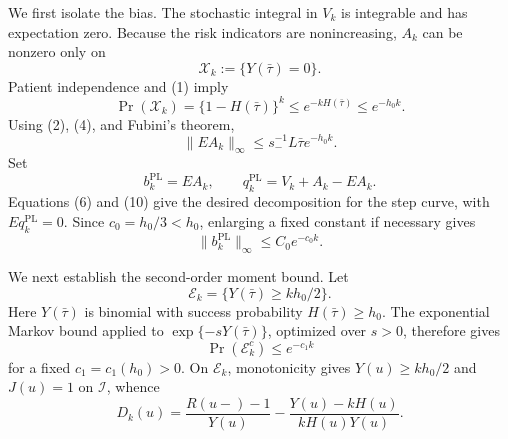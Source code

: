 We first isolate the bias.  The stochastic integral in \(V_k\) is integrable and has expectation zero.  Because the risk indicators are nonincreasing, \(A_k\) can be nonzero only on
\[
 \mathcal X_k:=\{Y(\bar\tau)=0\}.
\]
Patient independence and (1) imply
\[
 \Pr(\mathcal X_k)=\{1-H(\bar\tau)\}^k
 \le e^{-kH(\bar\tau)}\le e^{-h_0k}.                         \tag{8}
\]
Using (2), (4), and Fubini's theorem,
\[
 \|EA_k\|_\infty
 \le s_-^{-1}L\bar\tau e^{-h_0k}.                            \tag{9}
\]
Set
\[
 b_k^{\mathrm{PL}}=EA_k,
 \qquad
 q_k^{\mathrm{PL}}=V_k+A_k-EA_k.                             \tag{10}
\]
Equations (6) and (10) give the desired decomposition for the step curve, with \(Eq_k^{\mathrm{PL}}=0\).  Since \(c_0=h_0/3<h_0\), enlarging a fixed constant if necessary gives
\[
 \|b_k^{\mathrm{PL}}\|_\infty\le C_0e^{-c_0k}.             \tag{11}
\]

We next establish the second-order moment bound.  Let
\[
 \mathcal E_k=\{Y(\bar\tau)\ge kh_0/2\}.
\]
Here \(Y(\bar\tau)\) is binomial with success probability \(H(\bar\tau)\ge h_0\).  The exponential Markov bound applied to \(\exp\{-sY(\bar\tau)\}\), optimized over \(s>0\), therefore gives
\[
 \Pr(\mathcal E_k^c)\le e^{-c_1k}                            \tag{12}
\]
for a fixed \(c_1=c_1(h_0)>0\).  On \(\mathcal E_k\), monotonicity gives \(Y(u)\ge kh_0/2\) and \(J(u)=1\) on \(\mathcal I\), whence
\[
 D_k(u)=\frac{R(u-)-1}{Y(u)}
 -\frac{Y(u)-kH(u)}{kH(u)Y(u)}.                              \tag{13}
\]

